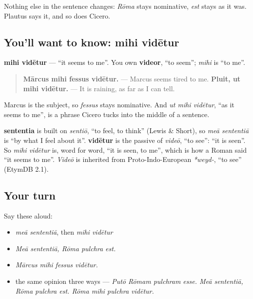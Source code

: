 Nothing else in the sentence changes: \emph{Rōma} stays nominative, \emph{est} stays as it was. Plautus says it, and so does Cicero.

\subsection*{You'll want to know: mihi vidētur}
\textbf{mihi vidētur} — \textquotedblleft{}it seems to me\textquotedblright{}. You own \textbf{videor}, \textquotedblleft{}to seem\textquotedblright{}; \emph{mihi} is \textquotedblleft{}to me\textquotedblright{}.

\begin{quote}
\textbf{Mārcus mihi fessus vidētur.} — Marcus seems tired to me. \textbf{Pluit, ut mihi vidētur.} — It is raining, as far as I can tell.
\end{quote}

Marcus is the subject, so \emph{fessus} stays nominative. And \emph{ut mihi vidētur}, \textquotedblleft{}as it seems to me\textquotedblright{}, is a phrase Cicero tucks into the middle of a sentence.

\begin{cousinweb}
\textbf{sententia} is built on \emph{sentiō}, \textquotedblleft{}to feel, to think\textquotedblright{} (Lewis \& Short), so \emph{meā sententiā} is \textquotedblleft{}by what I feel about it\textquotedblright{}. \textbf{vidētur} is the passive of \emph{videō}, \textquotedblleft{}to see\textquotedblright{}: \textquotedblleft{}it is seen\textquotedblright{}. So \emph{mihi vidētur} is, word for word, \textquotedblleft{}it is seen, to me\textquotedblright{}, which is how a Roman said \textquotedblleft{}it seems to me\textquotedblright{}. \emph{Videō} is inherited from Proto-Indo-European \emph{*weyd-}, \textquotedblleft{}to see\textquotedblright{} (EtymDB 2.1).
\end{cousinweb}

\subsection*{Your turn}
Say these aloud:

\begin{itemize}
\raggedright
  \item \emph{meā sententiā}, then \emph{mihi vidētur}
  \item \emph{Meā sententiā, Rōma pulchra est.}
  \item \emph{Mārcus mihi fessus vidētur.}
  \item the same opinion three ways — \emph{Putō Rōmam pulchram esse. Meā sententiā, Rōma pulchra est. Rōma mihi pulchra vidētur.}
\end{itemize}

